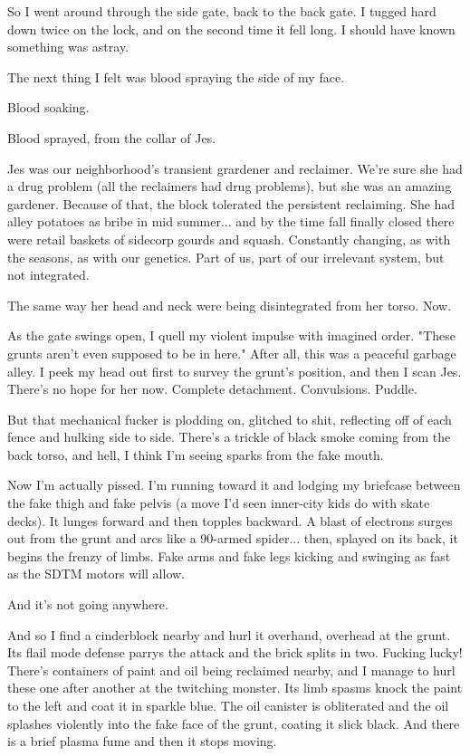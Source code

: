 \documentclass{amsbook}
\begin{document}
So I went around through the side gate, back to the back gate.  I tugged hard down twice on the lock, and on the second time it fell long.  I should have known something was astray.

The next thing I felt was blood spraying the side of my face.

Blood soaking.

Blood sprayed, from the collar of Jes. 

Jes was our neighborhood's transient grardener and reclaimer.  We're sure she had a drug problem (all the reclaimers had drug problems), but she was an amazing gardener.  Because of that, the block tolerated the persistent reclaiming.  She had alley potatoes as bribe in mid summer... and by the time fall finally closed there were retail baskets of sidecorp gourds and squash.  Constantly changing, as with the seasons, as with our genetics.  Part of us, part of our irrelevant system, but not integrated.

The same way her head and neck were being disintegrated from her torso.  Now.

As the gate swings open, I quell my violent impulse with imagined order.  "These grunts aren't even supposed to be in here."  After all, this was a peaceful garbage alley.  I peek my head out first to survey the grunt's position, and then I scan Jes.  There's no hope for her now.  Complete detachment.  Convulsions.  Puddle.

But that mechanical fucker is plodding on, glitched to shit, reflecting off of each fence and hulking side to side. There's a trickle of black smoke coming from the back torso, and hell, I think I'm seeing sparks from the fake mouth.

Now I'm actually pissed.  I'm running toward it and lodging my briefcase between the fake thigh and fake pelvis (a move I'd seen inner-city kids do with skate decks).  It lunges forward and then topples backward.  A blast of electrons surges out from the grunt and arcs like a 90-armed spider... then, splayed on its back, it begins the frenzy of limbs.  Fake arms and fake legs kicking and swinging as fast as the SDTM motors will allow.

And it's not going anywhere.

And so I find a cinderblock nearby and hurl it overhand, overhead at the grunt.  Its flail mode defense parrys the attack and the brick splits in two.  Fucking lucky!  There's containers of paint and oil being reclaimed nearby, and I manage to hurl these one after another at the twitching monster.  Its limb spasms knock the paint to the left and coat it in sparkle blue.  The oil canister is obliterated and the oil splashes violently into the fake face of the grunt, coating it slick black.  And there is a brief plasma fume and then it stops moving.  
\end{document}
